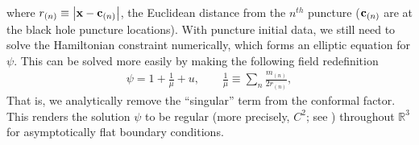 \documentclass{ws-ijmpd}
\begin{document}
where $r_{(n)}\equiv\left|{\bf x} - {\bf c}_{(n)}\right|$, the
Euclidean distance from the $n^{th}$ puncture
(${\bf c}_{(n)}$ are at the black hole puncture locations).
With puncture initial data, we still need to solve the Hamiltonian
constraint numerically, which forms an elliptic equation for $\psi$.
This can be solved more easily by making the following field
redefinition\cite{Brandt:1997tf}
\begin{align}
   \psi
   =
   1
   +
   \frac{1}{\mu}
   +
   u
   ,\qquad
   \frac{1}{\mu}
   \equiv
   \sum_{n}\frac{m_{(n)}}{2r_{(n)}}
   ,
\end{align}
That is, we analytically remove the ``singular'' 
term from the conformal factor.
This renders the solution $\psi$ to be regular 
(more precisely, $C^2$; see )
throughout $\mathbb{R}^3$ for asymptotically flat boundary conditions.
\end{document}

